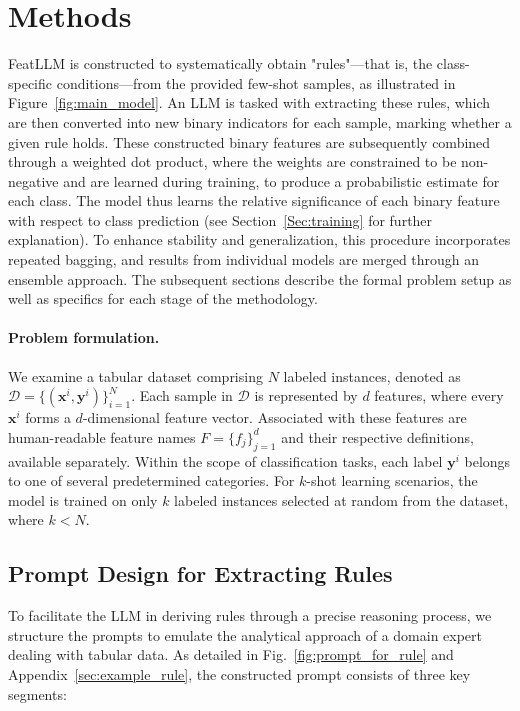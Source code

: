 \section{Methods}
\textsf{FeatLLM} is constructed to systematically obtain "rules"—that is, the class-specific conditions—from the provided few-shot samples, as illustrated in Figure~\ref{fig:main_model}. An LLM is tasked with extracting these rules, which are then converted into new binary indicators for each sample, marking whether a given rule holds. These constructed binary features are subsequently combined through a weighted dot product, where the weights are constrained to be non-negative and are learned during training, to produce a probabilistic estimate for each class. The model thus learns the relative significance of each binary feature with respect to class prediction (see Section~\ref{Sec:training} for further explanation). To enhance stability and generalization, this procedure incorporates repeated bagging, and results from individual models are merged through an ensemble approach. The subsequent sections describe the formal problem setup as well as specifics for each stage of the methodology.

\vspace*{-0.12in}
\paragraph{Problem formulation.} We examine a tabular dataset comprising $N$ labeled instances, denoted as $\mathcal{D} = \{(\mathbf{x}^i, \mathbf{y}^i)\}_{i=1}^{N}$. Each sample in $\mathcal{D}$ is represented by $d$ features, where every $\mathbf{x}^i$ forms a $d$-dimensional feature vector. Associated with these features are human-readable feature names $F = \{f_j\}_{j=1}^{d}$ and their respective definitions, available separately. Within the scope of classification tasks, each label $\mathbf{y}^i$ belongs to one of several predetermined categories. For $k$-shot learning scenarios, the model is trained on only $k$ labeled instances selected at random from the dataset, where $k < N$.

\subsection{Prompt Design for Extracting Rules}
\label{Sec:prompt_design}
To facilitate the LLM in deriving rules through a precise reasoning process, we structure the prompts to emulate the analytical approach of a domain expert dealing with tabular data. As detailed in Fig.~\ref{fig:prompt_for_rule} and Appendix~\ref{sec:example_rule}, the constructed prompt consists of three key segments:

